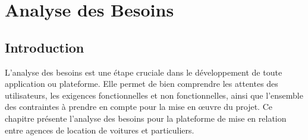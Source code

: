 \chapter{Analyse des Besoins}
\label{chap:AnalysedesBesoins}

\section{Introduction}
L'analyse des besoins est une étape cruciale dans le développement de toute application ou plateforme. Elle permet de bien comprendre les attentes des utilisateurs, les exigences fonctionnelles et non fonctionnelles, ainsi que l'ensemble des contraintes à prendre en compte pour la mise en œuvre du projet. Ce chapitre présente l'analyse des besoins pour la plateforme de mise en relation entre agences de location de voitures et particuliers.

